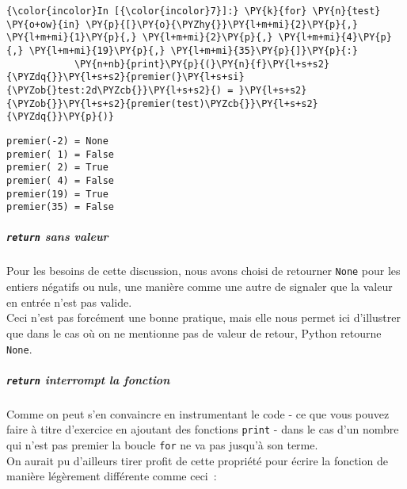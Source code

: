     \begin{Verbatim}[commandchars=\\\{\}]
{\color{incolor}In [{\color{incolor}7}]:} \PY{k}{for} \PY{n}{test} \PY{o+ow}{in} \PY{p}{[}\PY{o}{\PYZhy{}}\PY{l+m+mi}{2}\PY{p}{,} \PY{l+m+mi}{1}\PY{p}{,} \PY{l+m+mi}{2}\PY{p}{,} \PY{l+m+mi}{4}\PY{p}{,} \PY{l+m+mi}{19}\PY{p}{,} \PY{l+m+mi}{35}\PY{p}{]}\PY{p}{:}
            \PY{n+nb}{print}\PY{p}{(}\PY{n}{f}\PY{l+s+s2}{\PYZdq{}}\PY{l+s+s2}{premier(}\PY{l+s+si}{\PYZob{}test:2d\PYZcb{}}\PY{l+s+s2}{) = }\PY{l+s+s2}{\PYZob{}}\PY{l+s+s2}{premier(test)\PYZcb{}}\PY{l+s+s2}{\PYZdq{}}\PY{p}{)}
\end{Verbatim}


    \begin{Verbatim}[commandchars=\\\{\}]
premier(-2) = None
premier( 1) = False
premier( 2) = True
premier( 4) = False
premier(19) = True
premier(35) = False

    \end{Verbatim}

    \hypertarget{return-sans-valeur}{%
\subparagraph{\texorpdfstring{\texttt{return} sans
valeur}{return sans valeur}}\label{return-sans-valeur}}

    Pour les besoins de cette discussion, nous avons choisi de retourner
\texttt{None} pour les entiers négatifs ou nuls, une manière comme une
autre de signaler que la valeur en entrée n'est pas valide.\\

Ceci n'est pas forcément une bonne pratique, mais elle nous permet ici
d'illustrer que dans le cas où on ne mentionne pas de valeur de retour,
Python retourne \texttt{None}.

    \hypertarget{return-interrompt-la-fonction}{%
\subparagraph{\texorpdfstring{\texttt{return} interrompt la
fonction}{return interrompt la fonction}}\label{return-interrompt-la-fonction}}

    Comme on peut s'en convaincre en instrumentant le code - ce que vous
pouvez faire à titre d'exercice en ajoutant des fonctions \texttt{print}
- dans le cas d'un nombre qui n'est pas premier la boucle \texttt{for}
ne va pas jusqu'à son terme.\\

    On aurait pu d'ailleurs tirer profit de cette propriété pour écrire la
fonction de manière légèrement différente comme ceci~:

